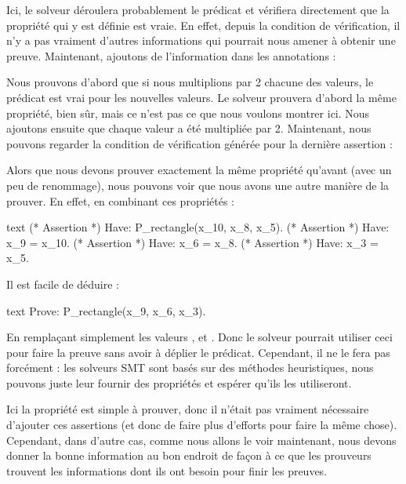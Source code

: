 





Ici, le solveur déroulera probablement le prédicat et vérifiera directement
que la propriété qui y est définie est vraie. En effet, depuis la condition de
vérification, il n'y a pas vraiment d'autres informations qui pourrait nous
amener à obtenir une preuve. Maintenant, ajoutons de l'information dans les
annotations :






Nous prouvons d'abord que si nous multiplions par 2 chacune des valeurs, le
prédicat est vrai pour les nouvelles valeurs. Le solveur prouvera d'abord
la même propriété, bien sûr, mais ce n'est pas ce que nous voulons montrer ici.
Nous ajoutons ensuite que chaque valeur a été multipliée par 2. Maintenant, nous
pouvons regarder la condition de vérification générée pour la dernière assertion :





Alors que nous devons prouver exactement la même propriété qu'avant (avec un peu
de renommage), nous pouvons voir que nous avons une autre manière de la prouver.
En effet, en combinant ces propriétés :


\begin{CodeBlock}{text}
(* Assertion *)
Have: P_rectangle(x_10, x_8, x_5).
(* Assertion *)
Have: x_9 = x_10.
(* Assertion *)
Have: x_6 = x_8.
(* Assertion *)
Have: x_3 = x_5.
\end{CodeBlock}


Il est facile de déduire :


\begin{CodeBlock}{text}
Prove: P_rectangle(x_9, x_6, x_3).
\end{CodeBlock}


En remplaçant simplement les valeurs ,  et
. Donc le solveur pourrait utiliser ceci pour faire la preuve
sans avoir à déplier le prédicat. Cependant, il ne le fera pas forcément : les
solveurs SMT sont basés sur des méthodes heuristiques, nous pouvons juste leur
fournir des propriétés et espérer qu'ils les utiliseront.


Ici la propriété est simple à prouver, donc il n'était pas vraiment nécessaire
d'ajouter ces assertions (et donc de faire plus d'efforts pour faire la même
chose). Cependant, dans d'autre cas, comme nous allons le voir maintenant, nous
devons donner la bonne information au bon endroit de façon à ce que les prouveurs
trouvent les informations dont ils ont besoin pour finir les preuves.



